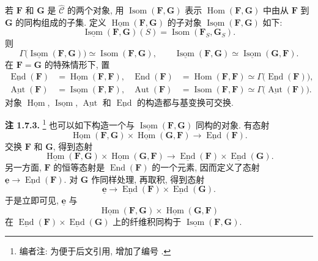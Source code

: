 若 \(\mathbf F\) 和 \(\mathbf G\) 是 \(\widehat{\mathscr C}\)
的两个对象, 用 \(\operatorname{Isom}(\mathbf F,\mathbf G)\) 表示
\(\operatorname{Hom}(\mathbf F,\mathbf G)\) 中由从 \(\mathbf F\)
到 \(\mathbf G\) 的同构组成的子集. 定义
\(\underline{\operatorname{Hom}}(\mathbf F,\mathbf G)\) 的子对象
\(\underline{\operatorname{Isom}}(\mathbf F,\mathbf G)\) 如下:
\[
  \underline{\operatorname{Isom}}(\mathbf F,\mathbf G)(S)
    =\operatorname{Isom}(\mathbf F_S,\mathbf G_S).
\]
则
\[
  \Gamma\bigl(\underline{\operatorname{Isom}}
    (\mathbf F,\mathbf G)\bigr)
    \simeq\operatorname{Isom}(\mathbf F,\mathbf G),
  \qquad
  \underline{\operatorname{Isom}}(\mathbf F,\mathbf G)
    \simeq
  \underline{\operatorname{Isom}}(\mathbf G,\mathbf F).
\]
在 \(\mathbf F=\mathbf G\) 的特殊情形下, 置
\begin{align*}
  \underline{\operatorname{End}}(\mathbf F)
    &=\underline{\operatorname{Hom}}(\mathbf F,\mathbf F),
  &
  \operatorname{End}(\mathbf F)
    &=\operatorname{Hom}(\mathbf F,\mathbf F)
      \simeq\Gamma\bigl(\underline{\operatorname{End}}(\mathbf F)\bigr),\\
  \underline{\operatorname{Aut}}(\mathbf F)
    &=\underline{\operatorname{Isom}}(\mathbf F,\mathbf F),
  &
  \operatorname{Aut}(\mathbf F)
    &=\operatorname{Isom}(\mathbf F,\mathbf F)
      \simeq\Gamma\bigl(\underline{\operatorname{Aut}}(\mathbf F)\bigr).
\end{align*}
对象 \(\underline{\operatorname{Hom}}\),
\(\underline{\operatorname{Isom}}\),
\(\underline{\operatorname{Aut}}\) 和
\(\underline{\operatorname{End}}\) 的构造都与基变换可交换.

\medskip
\noindent{}\textbf{注 1.7.3.}
\footnote{编者注: 为便于后文引用, 增加了编号
.}
也可以如下构造一个与
\(\underline{\operatorname{Isom}}(\mathbf F,\mathbf G)\) 同构的对象.
有态射
\[
  \underline{\operatorname{Hom}}(\mathbf F,\mathbf G)
    \times
  \underline{\operatorname{Hom}}(\mathbf G,\mathbf F)
    \longrightarrow
  \underline{\operatorname{End}}(\mathbf F).
\]
交换 \(\mathbf F\) 和 \(\mathbf G\), 得到态射
\[
  \underline{\operatorname{Hom}}(\mathbf F,\mathbf G)
    \times
  \underline{\operatorname{Hom}}(\mathbf G,\mathbf F)
    \longrightarrow
  \underline{\operatorname{End}}(\mathbf F)
    \times
  \underline{\operatorname{End}}(\mathbf G).
\]
另一方面, \(\mathbf F\) 的恒等态射是
\(\operatorname{End}(\mathbf F)\) 的一个元素, 因而定义了态射
\(\underline{\mathbf e}\to
\underline{\operatorname{End}}(\mathbf F)\). 对 \(\mathbf G\) 作同样处理,
再取积, 得到态射
\[
  \underline{\mathbf e}\longrightarrow
  \underline{\operatorname{End}}(\mathbf F)
    \times
  \underline{\operatorname{End}}(\mathbf G).
\]
于是立即可见, \(\underline{\mathbf e}\) 与
\[
  \underline{\operatorname{Hom}}(\mathbf F,\mathbf G)
    \times
  \underline{\operatorname{Hom}}(\mathbf G,\mathbf F)
\]
在
\(\underline{\operatorname{End}}(\mathbf F)
\times\underline{\operatorname{End}}(\mathbf G)\)
上的纤维积同构于
\(\underline{\operatorname{Isom}}(\mathbf F,\mathbf G)\).

